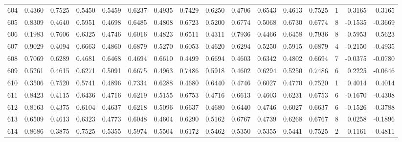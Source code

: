 \begin{tabular}{lrrrrrrrrrrrrrrr}
604 &      0.4360 &  0.7525 &  0.5450 &  0.5459 &  0.6237 &  0.4935 &  0.7429 &  0.6250 &  0.4706 &  0.6543 &   0.4613 &     0.7525 &      1 &                    0.3165 &                     0.3165 \\
605 &      0.8309 &  0.4640 &  0.5951 &  0.4698 &  0.6485 &  0.4808 &  0.6723 &  0.5200 &  0.6774 &  0.5068 &   0.6730 &     0.6774 &      8 &                   -0.1535 &                    -0.3669 \\
606 &      0.1983 &  0.7606 &  0.6325 &  0.4746 &  0.6016 &  0.4823 &  0.6511 &  0.4311 &  0.7936 &  0.4466 &   0.6458 &     0.7936 &      8 &                    0.5953 &                     0.5623 \\
607 &      0.9029 &  0.4094 &  0.6663 &  0.4860 &  0.6879 &  0.5270 &  0.6053 &  0.4620 &  0.6294 &  0.5250 &   0.5915 &     0.6879 &      4 &                   -0.2150 &                    -0.4935 \\
608 &      0.7069 &  0.6289 &  0.4681 &  0.6468 &  0.4694 &  0.6610 &  0.4499 &  0.6694 &  0.4603 &  0.6342 &   0.4802 &     0.6694 &      7 &                   -0.0375 &                    -0.0780 \\
609 &      0.5261 &  0.4615 &  0.6271 &  0.5091 &  0.6675 &  0.4963 &  0.7486 &  0.5918 &  0.4602 &  0.6294 &   0.5250 &     0.7486 &      6 &                    0.2225 &                    -0.0646 \\
610 &      0.3506 &  0.7520 &  0.5741 &  0.4896 &  0.7334 &  0.6288 &  0.4680 &  0.6440 &  0.4746 &  0.6027 &   0.4770 &     0.7520 &      1 &                    0.4014 &                     0.4014 \\
611 &      0.8423 &  0.4115 &  0.6436 &  0.4716 &  0.6219 &  0.5155 &  0.6753 &  0.4716 &  0.6613 &  0.4603 &   0.6231 &     0.6753 &      6 &                   -0.1670 &                    -0.4308 \\
612 &      0.8163 &  0.4375 &  0.6104 &  0.4637 &  0.6218 &  0.5096 &  0.6637 &  0.4680 &  0.6440 &  0.4746 &   0.6027 &     0.6637 &      6 &                   -0.1526 &                    -0.3788 \\
613 &      0.6509 &  0.4613 &  0.6323 &  0.4773 &  0.6048 &  0.4604 &  0.6290 &  0.5162 &  0.6767 &  0.4739 &   0.6268 &     0.6767 &      8 &                    0.0258 &                    -0.1896 \\
614 &      0.8686 &  0.3875 &  0.7525 &  0.5355 &  0.5974 &  0.5504 &  0.6172 &  0.5462 &  0.5350 &  0.5355 &   0.5441 &     0.7525 &      2 &                   -0.1161 &                    -0.4811 \\

\end{tabular}

